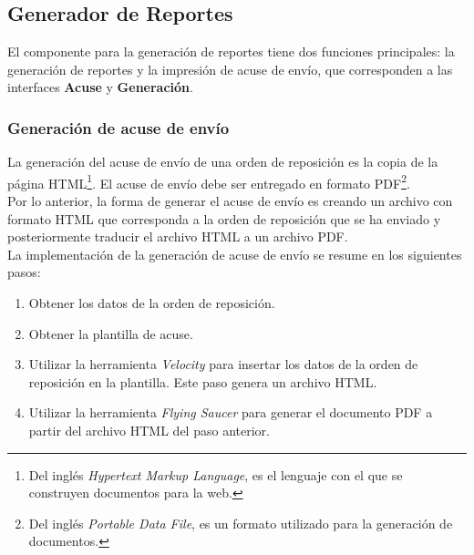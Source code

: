 \subsection{Generador de Reportes}
El componente para la generación de reportes tiene dos funciones principales: la generación de reportes y la impresión de acuse de envío, que corresponden a las interfaces \textbf{Acuse} y \textbf{Generación}.
\subsubsection{Generación de acuse de envío}\label{sec:gen-acuse}
La generación del acuse de envío de una orden de reposición es la copia de la página HTML\footnote{Del inglés \textit{Hypertext Markup Language}, es el lenguaje con el que se construyen documentos para la web\cite{HTMLCSSCompleteReference}.}. El acuse de envío debe ser entregado en formato PDF\footnote{Del inglés \textit{Portable Data File}, es un formato utilizado para la generación de documentos\cite{iTextInAction}.}.\\
Por lo anterior, la forma de generar el acuse de envío es creando un archivo con formato HTML que corresponda a la orden de reposición que se ha enviado y posteriormente traducir el archivo HTML a un archivo PDF.\\
La implementación de la generación de acuse de envío se resume en los siguientes pasos:
\begin{enumerate}
	\item Obtener los datos de la orden de reposición.
	\item Obtener la plantilla de acuse.
	\item Utilizar la herramienta \textit{Velocity} para insertar los datos de la orden de reposición en la plantilla. Este paso genera un archivo HTML.
	\item Utilizar la herramienta \textit{Flying Saucer} para generar el documento PDF a partir del archivo HTML del paso anterior.
\end{enumerate}
